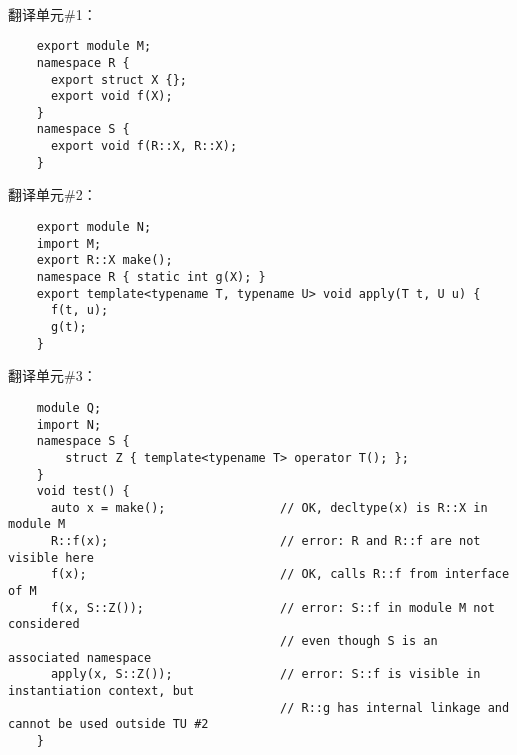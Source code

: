 \paragraph{} %
\begin{example}
  翻译单元\#1：
  \begin{lstlisting}
    export module M;
    namespace R {
      export struct X {};
      export void f(X);
    }
    namespace S {
      export void f(R::X, R::X);
    }
  \end{lstlisting}
  翻译单元\#2：
  \begin{lstlisting}
    export module N;
    import M;
    export R::X make();
    namespace R { static int g(X); }
    export template<typename T, typename U> void apply(T t, U u) {
      f(t, u);
      g(t);
    }
  \end{lstlisting}
  翻译单元\#3：
  \begin{lstlisting}
    module Q;
    import N;
    namespace S {
        struct Z { template<typename T> operator T(); };
    }
    void test() {
      auto x = make();                // OK, decltype(x) is R::X in module M
      R::f(x);                        // error: R and R::f are not visible here
      f(x);                           // OK, calls R::f from interface of M
      f(x, S::Z());                   // error: S::f in module M not considered
                                      // even though S is an associated namespace
      apply(x, S::Z());               // error: S::f is visible in instantiation context, but
                                      // R::g has internal linkage and cannot be used outside TU #2
    }
  \end{lstlisting}
\end{example}
